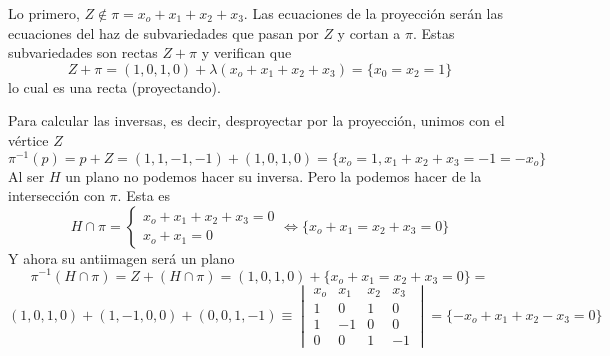 \begin{sol}
    Lo primero, $Z \nin \pi= x_o + x_1 + x_2 + x_3$. Las ecuaciones de la proyecci\'on ser\'an las ecuaciones del haz de subvariedades que pasan por $Z$ y cortan a $\pi$. Estas subvariedades son rectas $Z+\pi$ y verifican que 
    $$Z+\pi=(1,0,1,0)+\lambda( x_o + x_1 + x_2 + x_3)=\{x_0=x_2=1\}$$
    lo cual es una recta (proyectando).

    Para calcular las inversas, es decir, desproyectar por la proyecci\'on, unimos con el v\'ertice $Z$
    $$\pi^{-1}(p)=p+Z = (1,1,-1,-1)+(1,0,1,0)=\{x_o=1, x_1+x_2+x_3=-1=-x_o\}$$
    Al ser $H$ un plano no podemos hacer su inversa. Pero la podemos hacer de la intersecci\'on con $\pi$. Esta es
    $$H \cap \pi =\begin{cases}
        x_o + x_1 + x_2 + x_3=0 \\ x_o + x_1=0        
    \end{cases} \iff \{
       x_o+x_1=x_2+x_3=0\}$$
       Y ahora su antiimagen ser\'a un plano
    $$\pi^{-1}(H \cap \pi)=Z+(H \cap \pi) = (1,0,1,0)+ \{
       x_o+x_1=x_2+x_3=0\}=$$
       $$(1,0,1,0)+(1,-1,0,0)+(0,0,1,-1)\equiv\begin{vmatrix}
           x_o & x_1 & x_2 & x_3 \\ 1 & 0 & 1 & 0 \\ 1 & -1 & 0 & 0 \\ 0 & 0 & 1 & -1
       \end{vmatrix}=\{-x_o+x_1+x_2-x_3=0\}$$
\end{sol}